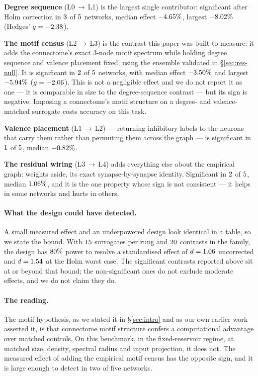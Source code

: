 \textbf{Degree sequence} (L0\,$\rightarrow$\,L1) is the largest single contributor:
significant after Holm correction in $3$ of $5$ networks, median
effect $-4.65\%$, largest $-8.02\%$ (Hedges'
$g = -2.38$).

\textbf{The motif census} (L2\,$\rightarrow$\,L3) is the contrast this paper was built to
measure: it adds the connectome's exact 3-node motif spectrum while holding degree
sequence and valence placement fixed, using the ensemble validated in
\S\ref{sec:res-null}. It is significant in $2$ of $5$ networks, with
median effect $-3.50\%$ and largest $-5.94\%$
($g = -2.06$). This is not a negligible effect and we do not report it as
one --- it is comparable in size to the degree-sequence contrast --- but its sign is
negative. Imposing a connectome's motif structure on a degree- and valence-matched
surrogate costs accuracy on this task.

\textbf{Valence placement} (L1\,$\rightarrow$\,L2) --- returning inhibitory labels to the
neurons that carry them rather than permuting them across the graph --- is significant in
$1$ of $5$, median $-0.82\%$.

\textbf{The residual wiring} (L3\,$\rightarrow$\,L4) adds everything else about the
empirical graph: weights aside, its exact synapse-by-synapse identity. Significant in
$2$ of $5$, median $1.06\%$, and it is the one
property whose sign is not consistent --- it helps in some networks and hurts in others.

\paragraph{What the design could have detected.}
A small measured effect and an underpowered design look identical in a table, so we state
the bound. With $15$ surrogates per rung and $20$ contrasts
in the family, the design has $80\%$ power to resolve a standardised effect of
$d = 1.06$ uncorrected and $d = 1.54$ at the Holm worst case. The
significant contrasts reported above sit at or beyond that bound; the non-significant
ones do not exclude moderate effects, and we do not claim they do.

\paragraph{The reading.}
The motif hypothesis, as we stated it in \S\ref{sec:intro} and as our own earlier work
asserted it, is that connectome motif structure confers a computational advantage over
matched controls. On this benchmark, in the fixed-reservoir regime, at matched size,
density, spectral radius and input projection, it does not. The measured effect of adding
the empirical motif census has the opposite sign, and it is large enough to detect in two
of five networks.

